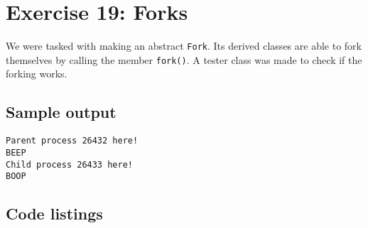 \documentclass[11pt]{article}
\begin{document}
\section*{Exercise 19: Forks}
We were tasked with making an abstract \texttt{Fork}.
Its derived classes are able to fork themselves by calling the member \texttt{fork()}.
A tester class was made to check if the forking works.

\subsection*{Sample output}
\begin{lstlisting}
Parent process 26432 here!
BEEP
Child process 26433 here!
BOOP
\end{lstlisting}

\subsection*{Code listings}









\end{document}
